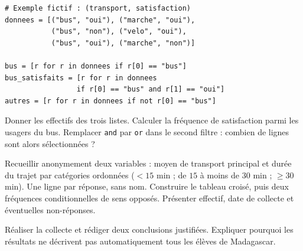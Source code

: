 \begin{lstlisting}
# Exemple fictif : (transport, satisfaction)
donnees = [("bus", "oui"), ("marche", "oui"),
           ("bus", "non"), ("velo", "oui"),
           ("bus", "oui"), ("marche", "non")]

bus = [r for r in donnees if r[0] == "bus"]
bus_satisfaits = [r for r in donnees
                 if r[0] == "bus" and r[1] == "oui"]
autres = [r for r in donnees if not r[0] == "bus"]
\end{lstlisting}
\begin{example}Donner les effectifs des trois listes. Calculer la fréquence de satisfaction parmi les usagers du bus. Remplacer \texttt{and} par \texttt{or} dans le second filtre : combien de lignes sont alors sélectionnées ?\end{example}
\begin{method}
Recueillir anonymement deux variables : moyen de transport principal et durée du trajet par catégories ordonnées ($<15$ min ; de $15$ à moins de $30$ min ; $\geq30$ min). Une ligne par réponse, sans nom. Construire le tableau croisé, puis deux fréquences conditionnelles de sens opposés. Présenter effectif, date de collecte et éventuelles non-réponses.
\end{method}
\begin{example}Réaliser la collecte et rédiger deux conclusions justifiées. Expliquer pourquoi les résultats ne décrivent pas automatiquement tous les élèves de Madagascar.\end{example}
